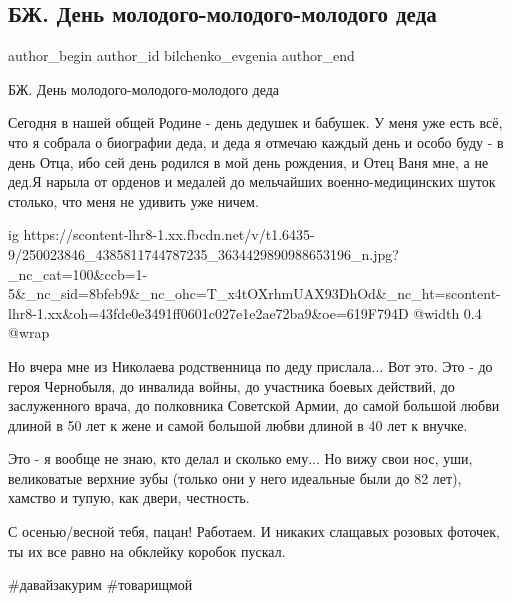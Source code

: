  
 
 
 
 
 
\subsection{БЖ. День молодого-молодого-молодого деда}
\label{sec:28_10_2021.fb.bilchenko_evgenia.1.dedushka}
 
\ifcmt
 author_begin
   author_id bilchenko_evgenia
 author_end
\fi

БЖ. День молодого-молодого-молодого деда

Сегодня в нашей общей Родине - день дедушек и бабушек. У меня уже есть всё, что
я собрала о биографии деда, и деда я отмечаю каждый день и особо буду - в день
Отца, ибо сей день родился в мой день рождения, и Отец Ваня мне, а не дед.Я
нарыла от орденов и медалей до мельчайших военно-медицинских шуток столько, что
меня не удивить уже ничем. 

\ifcmt
  ig https://scontent-lhr8-1.xx.fbcdn.net/v/t1.6435-9/250023846_4385811744787235_3634429890988653196_n.jpg?_nc_cat=100&ccb=1-5&_nc_sid=8bfeb9&_nc_ohc=T_x4tOXrhmUAX93DhOd&_nc_ht=scontent-lhr8-1.xx&oh=43fde0e3491ff0601c027e1e2ae72ba9&oe=619F794D
  @width 0.4
  @wrap 
\fi

Но вчера мне из Николаева родственница по деду прислала... Вот это. Это - до
героя Чернобыля, до инвалида войны, до участника боевых действий, до
заслуженного врача, до полковника Советской Армии, до самой большой любви
длиной в 50 лет к жене и самой большой любви длиной в 40 лет к внучке. 

Это - я вообще не знаю, кто делал и сколько ему... Но вижу свои нос, уши,
великоватые верхние зубы (только они у него идеальные были до 82 лет), хамство
и тупую, как двери, честность. 

С осенью/весной тебя, пацан! Работаем. И никаких слащавых розовых фоточек, ты
их все равно на обклейку коробок пускал.

\#давайзакурим \#товарищмой
